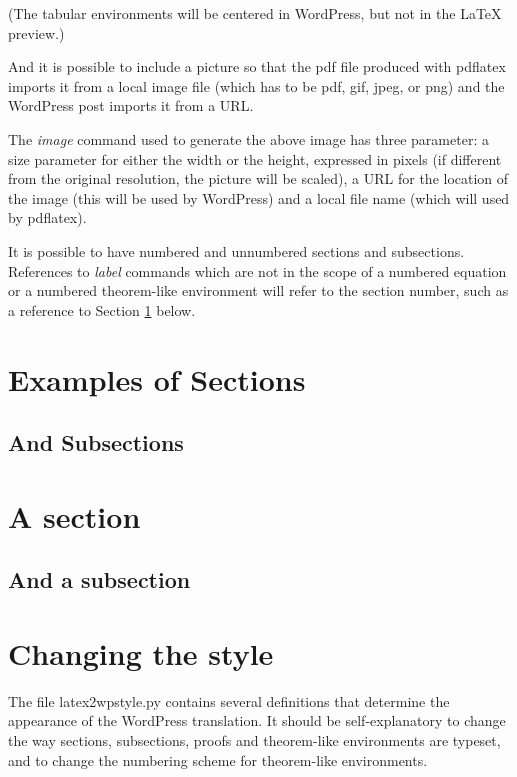 \documentclass[12pt]{article}
\begin{document}
(The tabular environments will be centered in WordPress, but
not in the LaTeX preview.)

And it is possible to include a picture so that the pdf file produced
with pdflatex imports it from a local image file (which has to be
pdf, gif, jpeg, or png) and the WordPress post imports it from a URL.


The {\em image} command used to generate the above image
has three parameter: a size parameter for either the width or the height,
expressed in pixels (if different from the original resolution, the picture
will be scaled), a URL for the location of the image (this will be used
by WordPress) and a local file name (which will used by pdflatex).

It is possible to have numbered and unnumbered sections and subsections.
References to {\em label} commands which are not in the scope of
a numbered equation or a numbered theorem-like environment
will refer to the section number, 
such as a reference to Section \ref{sec} below.

\section*{Examples of Sections}

\subsection*{And Subsections}

\section{A section}
\label{sec}

\subsection{And a subsection}

\section{Changing the style}

The file latex2wpstyle.py contains several definitions that determine
the appearance of the WordPress translation. It should be self-explanatory
to change the way sections, subsections, proofs and theorem-like
environments are typeset, and to change the numbering scheme
for theorem-like environments.
\end{document}
